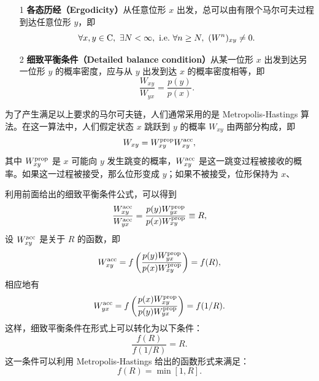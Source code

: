 \begin{itemize}
    \item[1] \textbf{各态历经（Ergodicity）}从任意位形 $x$ 出发，总可以由有限个马尔可夫过程到达任意位形 $y$，即 
    \begin{equation}
        \forall x, y \in \mathrm{C},\ \exists N<\infty,\ \mathrm{i. e.}\ \forall n\ge N,\ (W^n)_{xy}\ne 0.
    \end{equation}
    \item[2] \textbf{细致平衡条件（Detailed balance condition）}从某一位形 $x$ 出发到达另一位形 $y$ 的概率密度，应与从 $y$ 出发到达 $x$ 的概率密度相等，即 
    \begin{equation}
        \frac{W_{xy}}{W_{yx}}=\frac{p(y)}{p(x)}.
    \end{equation}
\end{itemize}
为了产生满足以上要求的马尔可夫链，人们通常采用的是 Metropolis-Hastings 算法\cite{Hastings1970MonteCS, 1953JChPh..21.1087M}。在这一算法中，人们假定状态 $x$ 跳跃到 $y$ 的概率 $W_{xy}$ 由两部分构成，即 
\begin{equation}
    W_{xy}=W_{xy}^{\mathrm{prop}}W_{xy}^{\mathrm{acc}},
\end{equation}
其中 $W_{xy}^{\mathrm{prop}}$ 是 $x$ 可能向 $y$ 发生跳变的概率，$W_{xy}^{\mathrm{acc}}$ 是这一跳变过程被接收的概率。如果这一过程被接受，那么位形变成 $y$；如果不被接受，位形保持为 $x$、

利用前面给出的细致平衡条件公式，可以得到 
\begin{equation}
    \frac{W_{xy}^{\mathrm{acc}}}{W_{yx}^{\mathrm{acc}}}=\frac{p(y)W_{yx}^{\mathrm{prop}}}{p(x)W_{xy}^{\mathrm{prop}}}\equiv R,
\end{equation}
设 $W_{xy}^{\mathrm{acc}}$ 是关于 $R$ 的函数，即 
\begin{equation}
    W_{xy}^{\mathrm{acc}}=f\left( \frac{p(y)W_{yx}^{\mathrm{prop}}}{p(x)W_{xy}^{\mathrm{prop}}} \right)=f(R),
\end{equation}
相应地有 
\begin{equation}
    W_{yx}^{\mathrm{acc}}=f\left( \frac{p(x)W_{xy}^{\mathrm{prop}}}{p(y)W_{yx}^{\mathrm{prop}}} \right) =f(1/R).
\end{equation}
这样，细致平衡条件在形式上可以转化为以下条件：
\begin{equation}
    \frac{f(R)}{f(1/R)}=R.
\end{equation}
这一条件可以利用 Metropolis-Hastings 给出的函数形式来满足：
\begin{equation}
    f(R)=\min [1,R].
\end{equation}
